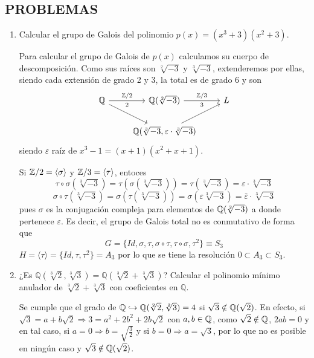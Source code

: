 \subsection*{PROBLEMAS}
\begin{enumerate}
    \item Calcular el grupo de Galois del polinomio $p(x)=(x^3 + 3)(x^2 + 3)$.
    \begin{dem}
        Para calcular el grupo de Galois de $p(x)$ calculamos su cuerpo de descomposici\'on. Como sus ra\'ices son $\sqrt[2]{-3}$ y $\sqrt[3]{-3}$, extenderemos por ellas, siendo cada extensi\'on de grado 2 y 3, la total es de grado 6 y son
        $$\bt \bb Q \rar{\bb Z/2}[swap]{2} \arrow{dr} & \bb Q(\sqrt[2]{-3}) \rar{\bb Z/3}[swap]{3} & L\\ & \bb Q(\sqrt[3]{-3}, \varepsilon \cdot \sqrt[3]{-3}) \arrow{ru} &  \et$$
        siendo $\varepsilon$ ra\'iz de $x^3-1 = (x+1)(x^2+x+1)$. 

        Si $\mathbb{Z}/2 = \langle \sigma \rangle$ y $\mathbb{Z}/3 = \langle \tau \rangle$, entoces
        $$\tau \circ \sigma(\sqrt[3]{-3}) = \tau(\sigma(\sqrt[3]{-3})) = \tau(\sqrt[3]{-3}) = \varepsilon\cdot \sqrt[3]{-3}$$
        $$\sigma  \circ \tau (\sqrt[3]{-3}) = \sigma(\tau(\sqrt[3]{-3})) = \sigma(\varepsilon \sqrt[3]{-3}) = \bar \varepsilon \cdot \sqrt[3]{-3}$$
        pues $\sigma$ es la conjugaci\'on compleja para elementos de $\mathbb{Q}(\sqrt[2]{-3})$ a donde pertenece $\varepsilon$. Es decir, el grupo de Galois total no es conmutativo de forma que 
        $$G = \{Id, \sigma, \tau, \sigma \circ \tau, \tau\circ \sigma, \tau^2\} \equiv S_3$$
        $H = \langle \tau \rangle = \{Id, \tau, \tau^2 \} = A_3$ por lo que se tiene la resoluci\'on $0 \subset A_3 \subset S_3$. 
    \end{dem}
    
    \item ¿Es $\mathbb{Q}(\sqrt[3]{2}, \sqrt[3]{3}) = \mathbb{Q}(\sqrt[3]{2} + \sqrt[3]{3})$? Calcular el polinomio mínimo anulador de $\sqrt[3]{2} + \sqrt[3]{3}$ con coeficientes en $\mathbb{Q}$.
    \begin{dem}
        Se cumple que el grado de $\mathbb{Q} \hookrightarrow \mathbb{Q}(\sqrt[2]{2}, \sqrt[2]{3}) = 4$ si $\sqrt{3} \notin \mathbb{Q}(\sqrt{2})$. En efecto, si $\sqrt{3} = a + b\sqrt{2} \Rightarrow 3 = a^2+2b^2 + 2b\sqrt{2}$ con $a,b \in \mathbb{Q}$, como $\sqrt{2} \notin \mathbb{Q}$, $2ab=0$ y en tal caso, si $a=0 \Rightarrow b=\sqrt{\frac{3}{2}}$ y si $b=0 \Rightarrow a =\sqrt{3}$, por lo que no es posible en ning\'un caso y $\sqrt{3} \notin \mathbb{Q}(\sqrt{2})$. 


\end{dem}
\end{enumerate}
